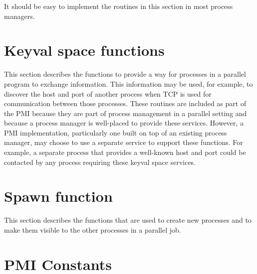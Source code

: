 \documentclass{article}
\begin{document}
It should be easy to implement the routines in this section in most process
managers. 












%

\section{Keyval space functions}
This section describes the functions to provide a way for processes in a
parallel program to exchange information.  This information may be used, for
example, to discover the host and port of another process when TCP is used for
communication between those processes.  These routines are included as part of
the PMI because they are part of process management in a parallel setting and
because a process manager is well-placed to provide these services.  However,
a PMI implementation, particularly one built on top of an existing process
manager, may choose to use a separate service to support these functions.
For example, a separate process that provides a well-known host and port could
be contacted by any process requiring these keyval space services.













\section{Spawn function}
This section describes the functions that are used to create new processes and
to make them visible to the other processes in a parallel job.  








\section{PMI Constants}


\let\SaveIndex=\theindex
\long\def\theindex#1{\SaveIndex{#1}\addcontentsline{toc}{section}{Index}}

\end{document}
